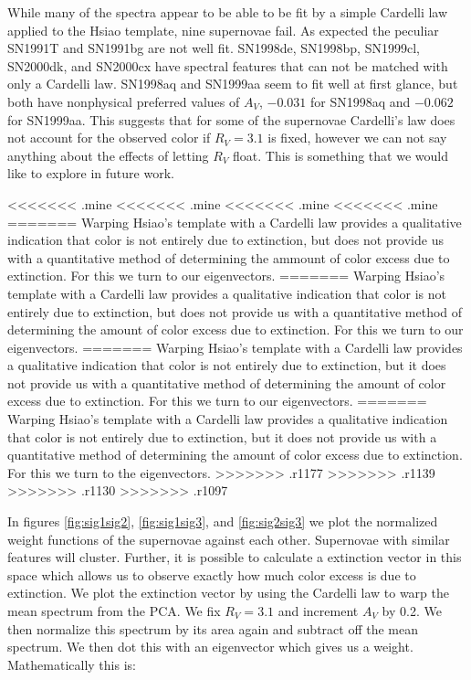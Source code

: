 While many of the spectra appear to be able to be fit by a simple Cardelli law applied to the Hsiao template, nine supernovae fail. As expected the peculiar SN1991T and SN1991bg are not well fit. SN1998de, SN1998bp, SN1999cl, SN2000dk, and SN2000cx have spectral features that can not be matched with only a Cardelli law. SN1998aq and SN1999aa seem to fit well at first glance, but both have nonphysical preferred values of $A_{V}$, $-0.031$ for SN1998aq and $-0.062$ for SN1999aa. This suggests that for some of the supernovae Cardelli's law does not account for the observed color if $ R_{V} =3.1$ is fixed, however we can not say anything about the effects of letting $R_{V}$ float. This is something that we would like to explore in future work.

<<<<<<< .mine
<<<<<<< .mine
<<<<<<< .mine
<<<<<<< .mine
%
=======
Warping Hsiao's template with a Cardelli law provides a qualitative indication that color is not entirely due to extinction, but does not provide us with a quantitative method of determining the ammount of color excess due to extinction. For this we turn to our eigenvectors.
=======
Warping Hsiao's template with a Cardelli law provides a qualitative indication that color is not entirely due to extinction, but does not provide us with a quantitative method of determining the amount of color excess due to extinction. For this we turn to our eigenvectors.
=======
Warping Hsiao's template with a Cardelli law provides a qualitative indication that color is not entirely due to extinction, but it does not provide us with a quantitative method of determining the amount of color excess due to extinction. For this we turn to our eigenvectors.
=======
Warping Hsiao's template with a Cardelli law provides a qualitative indication that color is not entirely due to extinction, but it does not provide us with a quantitative method of determining the amount of color excess due to extinction. For this we turn to the eigenvectors.
>>>>>>> .r1177
>>>>>>> .r1139
>>>>>>> .r1130
>>>>>>> .r1097

In figures \ref{fig:sig1sig2}, \ref{fig:sig1sig3}, and \ref{fig:sig2sig3} we plot the normalized weight functions of the supernovae against each other. Supernovae with similar features will cluster. Further, it is possible to calculate a extinction vector in this space which allows us to observe exactly how much color excess is due to extinction. We plot the extinction vector by using the Cardelli law to warp the mean spectrum from the PCA. We fix $R_{V} = 3.1$ and increment $A_{V}$ by 0.2. We then normalize this spectrum by its area again and subtract off the mean spectrum. We then dot this with an eigenvector which gives us a weight. Mathematically this is:

